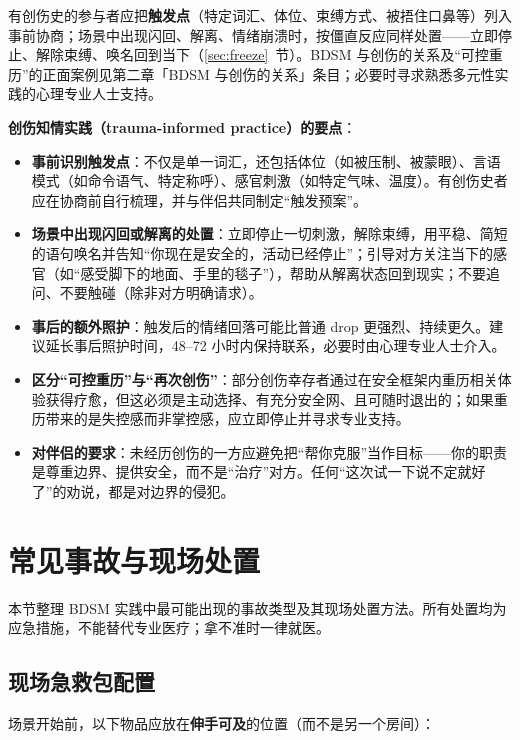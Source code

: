 \documentclass[12pt,UTF8]{ctexbook}
\begin{document}
有创伤史的参与者应把\textbf{触发点}（特定词汇、体位、束缚方式、被捂住口鼻等）列入事前协商；场景中出现闪回、解离、情绪崩溃时，按僵直反应同样处置——立即停止、解除束缚、唤名回到当下（\ref{sec:freeze}~节）。BDSM 与创伤的关系及“可控重历”的正面案例见第二章「BDSM 与创伤的关系」条目；必要时寻求熟悉多元性实践的心理专业人士支持。

\textbf{创伤知情实践（trauma-informed practice）的要点}：

\begin{itemize}
\item \textbf{事前识别触发点}：不仅是单一词汇，还包括体位（如被压制、被蒙眼）、言语模式（如命令语气、特定称呼）、感官刺激（如特定气味、温度）。有创伤史者应在协商前自行梳理，并与伴侣共同制定“触发预案”。
\item \textbf{场景中出现闪回或解离的处置}：立即停止一切刺激，解除束缚，用平稳、简短的语句唤名并告知“你现在是安全的，活动已经停止”；引导对方关注当下的感官（如“感受脚下的地面、手里的毯子”），帮助从解离状态回到现实；不要追问、不要触碰（除非对方明确请求）。
\item \textbf{事后的额外照护}：触发后的情绪回落可能比普通 drop 更强烈、持续更久。建议延长事后照护时间，48--72 小时内保持联系，必要时由心理专业人士介入。
\item \textbf{区分“可控重历”与“再次创伤”}：部分创伤幸存者通过在安全框架内重历相关体验获得疗愈，但这必须是主动选择、有充分安全网、且可随时退出的；如果重历带来的是失控感而非掌控感，应立即停止并寻求专业支持。
\item \textbf{对伴侣的要求}：未经历创伤的一方应避免把“帮你克服”当作目标——你的职责是尊重边界、提供安全，而不是“治疗”对方。任何“这次试一下说不定就好了”的劝说，都是对边界的侵犯。
\end{itemize}


\section{常见事故与现场处置}

本节整理 BDSM 实践中最可能出现的事故类型及其现场处置方法。所有处置均为应急措施，不能替代专业医疗；拿不准时一律就医。

\subsection{现场急救包配置}

场景开始前，以下物品应放在\textbf{伸手可及}的位置（而不是另一个房间）：
\end{document}
